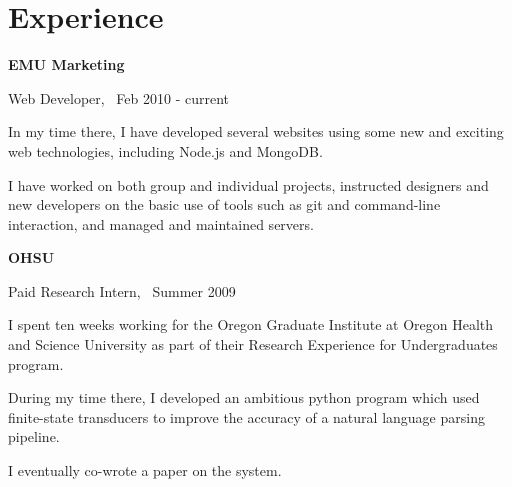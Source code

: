 \documentclass[10pt,letterpaper]{article}
\newenvironment{topic}[1]{
\begin{minipage}[t]{0.15\linewidth}\begin{flushleft}\begin{flushright}\textbf{#1}\end{flushright}\end{flushleft}\end{minipage}\hspace{1em}\vrule\hspace{1em}\begin{minipage}[t]{0.80\linewidth}\begin{flushright}\begin{flushleft}
}{
\end{flushleft}\end{flushright}\end{minipage}\vspace{1em}
}
\begin{document}
\section{Experience}
\begin{topic}{EMU Marketing}

  Web Developer, \ Feb 2010 - current

  \vspace{1em}
  
  In my time there, I have developed several websites using some new and
  exciting web technologies, including Node.js and MongoDB.

  \vspace{1em}
  
  I have worked on both group and individual projects, instructed designers and
  new developers on the basic use of tools such as git and command-line
  interaction, and managed and maintained servers.
\end{topic}

\vspace{1.5em}
\begin{topic}{OHSU}
  Paid Research Intern, \ Summer 2009

  \vspace{1em}

  I spent ten weeks working for the Oregon Graduate Institute at Oregon Health
  and Science University as part of their Research Experience for
  Undergraduates program.
  
  \vspace{1em}
  
  During my time there, I developed an ambitious python program which used
  finite-state transducers to improve the accuracy of a natural language
  parsing pipeline.

  \vspace{1em}

  I eventually co-wrote a paper on the system.
\end{topic}
\end{document}
